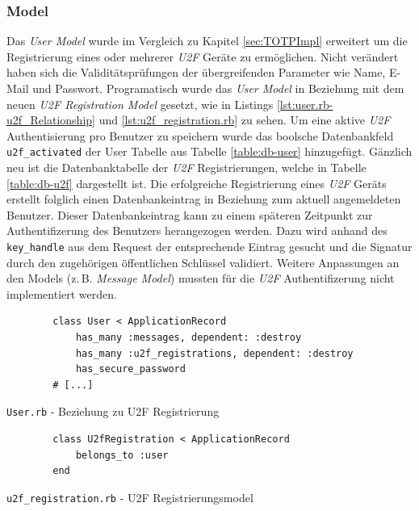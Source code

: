 \documentclass[11pt,a4paper,ngerman]{scrreprt}
\begin{document}
\subsubsection{Model}
Das \textit{User Model} wurde im Vergleich zu Kapitel \ref{sec:TOTPImpl} erweitert um die Registrierung eines oder mehrerer \textit{U2F} Geräte zu ermöglichen. Nicht verändert haben sich die Validitätsprüfungen der übergreifenden Parameter wie Name, E-Mail und Passwort. Programatisch wurde das \textit{User Model} in Beziehung mit dem neuen \textit{U2F Registration Model} gesetzt, wie in Listings \ref{lst:user.rb-u2f_Relationship} und \ref{lst:u2f_registration.rb} zu sehen. Um eine aktive \textit{U2F} Authentisierung pro Benutzer zu speichern wurde das boolsche Datenbankfeld \texttt{u2f\_activated} der User Tabelle aus Tabelle \ref{table:db-user} hinzugefügt. Gänzlich neu ist die Datenbanktabelle der \textit{U2F} Registrierungen, welche in Tabelle \ref{table:db-u2f} dargestellt ist. Die erfolgreiche Registrierung eines \textit{U2F} Geräts erstellt folglich einen Datenbankeintrag in Beziehung zum aktuell angemeldeten Benutzer. Dieser Datenbankeintrag kann zu einem späteren Zeitpunkt zur Authentifizerung des Benutzers herangezogen werden. Dazu wird anhand des \texttt{key\_handle} aus dem Request der entsprechende Eintrag gesucht und die Signatur durch den zugehörigen öffentlichen Schlüssel validiert. Weitere Anpassungen an den Models (z.\,B. \textit{Message Model}) mussten für die \textit{U2F} Authentifizerung nicht implementiert werden. 
\begin{listing}[htpb]
    \begin{verbatim}
        class User < ApplicationRecord
            has_many :messages, dependent: :destroy
            has_many :u2f_registrations, dependent: :destroy
            has_secure_password
        # [...]
    \end{verbatim}
    \caption{\texttt{User.rb} - Beziehung zu U2F Registrierung}
    \label{lst:user.rb-u2f_Relationship}
\end{listing}
\begin{listing}[htpb]
    \begin{verbatim}
        class U2fRegistration < ApplicationRecord
            belongs_to :user
        end
    \end{verbatim}
    \caption{\texttt{u2f\_registration.rb} - U2F Registrierungsmodel}
    \label{lst:u2f_registration.rb}
\end{listing}
\end{document}
